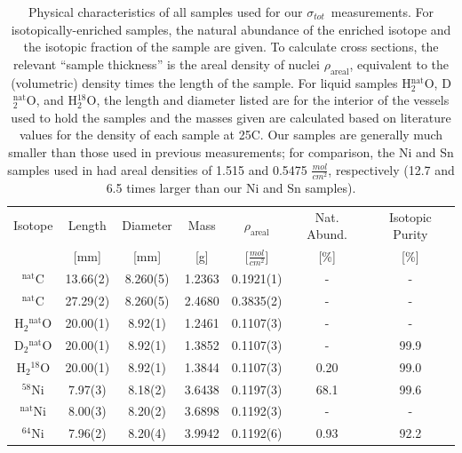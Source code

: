 \documentclass[twocolumn,secnumarabic,amssymb, nobibnotes, aps, prl,
superscriptaddress, nobalancelastpage]{revtex4}
\newcommand{\tot}{\ensuremath{\sigma_{tot}}}
\begin{document}
\begin{table}[ht]
    \caption{
        Physical characteristics of all samples used for our \tot\
        measurements. For isotopically-enriched samples, the natural abundance
        of the enriched isotope and the isotopic fraction of the sample are
        given. To calculate cross sections, the relevant ``sample thickness'' is the areal
        density of nuclei $\rho_{\text{areal}}$, equivalent to
        the (volumetric) density times the length of the sample. For liquid
        samples H$_{2}^{\text{nat}}$O, D$_{2}^{\text{nat}}$O, and H$_{2}^{18}$O,
        the length and diameter listed are for the interior of the vessels
        used to hold the samples and the masses given are calculated based on 
        literature values for the density of each sample at 25\textdegree{}C.
        Our samples are generally much smaller than those used in previous
        measurements; for comparison, the Ni and Sn samples used in \cite{Abfalterer2001,
        Finlay1993} had areal densities of 1.515 and 0.5475
        $\frac{mol}{cm^{2}}$, respectively (12.7 and 6.5 times larger than our
    Ni and Sn samples).}
    \label{SampleTable}
    \begin{center}
        \begin{tabular}{ c c c c c c c }
            \hline
            Isotope & Length & Diameter
            & Mass & $\rho_{\text{areal}}$ & Nat. Abund. & Isotopic Purity\\
                 & [mm] & [mm] & [g] & [$\frac{mol}{cm^{2}}$] & [\%] & [\%]\\
            \hline

            $^{\text{nat}}$C & 13.66(2) & 8.260(5) & 1.2363
            & 0.1921(1) & - & -\\
            $^{\text{nat}}$C & 27.29(2) & 8.260(5) & 2.4680
            & 0.3835(2) & - & -\\

            H$_{2}$$^{\text{nat}}$O & 20.00(1) & 8.92(1) & 1.2461 & 0.1107(3) & - &
            - \\
            D$_{2}$$^{\text{nat}}$O & 20.00(1) & 8.92(1) & 1.3852 & 0.1107(3) & - &
            99.9 \\
            H$_{2}$$^{18}$O & 20.00(1) & 8.92(1) & 1.3844 & 0.1107(3) & 0.20 &
            99.0\\

            $^{58}$Ni & 7.97(3)& 8.18(2) &
            3.6438 & 0.1197(3)& 68.1 & 99.6 \\
            $^{\text{nat}}$Ni & 8.00(3) & 8.20(2) &
            3.6898 & 0.1192(3)& - & -\\
            $^{64}$Ni & 7.96(2) & 8.20(4) &
            3.9942 & 0.1192(6) & 0.93 & 92.2\\


\end{tabular}
\end{center}
\end{table}
\end{document}
